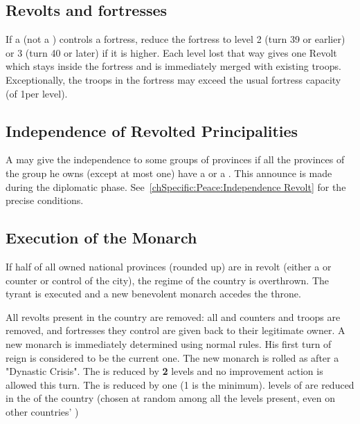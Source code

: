 \subsection{Revolts and fortresses}
\aparag If a \REVOLT (not a \REBELLION) controls a fortress, reduce the
fortress to level 2 (turn 39 or earlier) or 3 (turn 40 or later) if it is
higher.
\bparag Each level lost that way gives one Revolt \LD which stays inside the
fortress and is immediately merged with existing troops. Exceptionally, the
troops in the fortress may exceed the usual fortress capacity (of 1\LD per
level).

\subsection{Independence of Revolted Principalities}\label{chRedep:Peace:Independence Revolt}
\aparag A \MAJ may give the independence to some groups of provinces if all
the provinces of the group he owns (except at most one) have a \REVOLT or a
\REBELLION. This announce is made during the diplomatic
phase. See~\ref{chSpecific:Peace:Independence Revolt} for the precise
conditions.


\subsection{Execution of the Monarch}\label{chRedep:Execution Monarch by
  Revolts}
\aparag If half of all owned national provinces (rounded up) are in revolt
(either a \REVOLT or \REBELLION counter or control of the city), the regime of
the country is overthrown. The tyrant is executed and a new benevolent monarch
accedes the throne.

\aparag[Consequences]
\bparag All revolts present in the country are removed: all \REVOLT and
\REBELLION counters and troops are removed, and fortresses they control are
given back to their legitimate owner.
\bparag A new monarch is immediately determined using normal rules. His first
turn of reign is considered to be the current one. The new
monarch is rolled as after a "Dynastic Crisis".
\bparag The \STAB is reduced by \textbf{2} levels %
and no \STAB improvement action is allowed this turn.
\bparag The \DTI is reduced by one (1 is the minimum).
 levels of \TradeFLEET are reduced in the \CTZ of the country (chosen
at random among all the levels present, even on other countries' \TradeFLEET)

